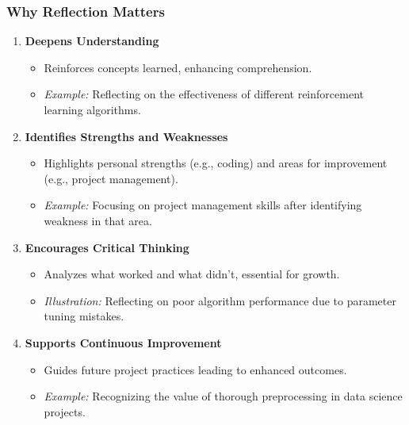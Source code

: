\documentclass[aspectratio=169]{beamer}
\begin{document}
\begin{frame}[fragile]
    \frametitle{Why Reflection Matters}
    \begin{enumerate}
        \item \textbf{Deepens Understanding}
            \begin{itemize}
                \item Reinforces concepts learned, enhancing comprehension.
                \item \textit{Example:} Reflecting on the effectiveness of different reinforcement learning algorithms.
            \end{itemize}
        
        \item \textbf{Identifies Strengths and Weaknesses}
            \begin{itemize}
                \item Highlights personal strengths (e.g., coding) and areas for improvement (e.g., project management).
                \item \textit{Example:} Focusing on project management skills after identifying weakness in that area.
            \end{itemize}
        
        \item \textbf{Encourages Critical Thinking}
            \begin{itemize}
                \item Analyzes what worked and what didn't, essential for growth.
                \item \textit{Illustration:} Reflecting on poor algorithm performance due to parameter tuning mistakes.
            \end{itemize}
    
        \item \textbf{Supports Continuous Improvement}
            \begin{itemize}
                \item Guides future project practices leading to enhanced outcomes.
                \item \textit{Example:} Recognizing the value of thorough preprocessing in data science projects.
            \end{itemize}
    \end{enumerate}
\end{frame}
\end{document}
